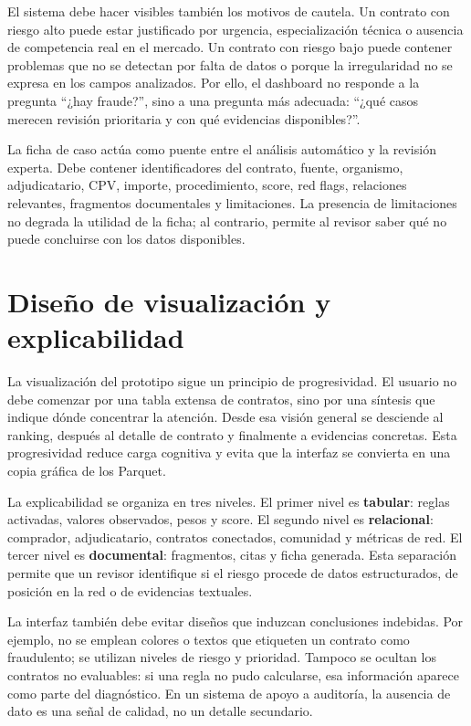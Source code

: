 \documentclass[11pt,a4paper,spanish]{book}
\numberwithin{equation}{chapter}
\numberwithin{figure}{chapter}
\begin{document}
El sistema debe hacer visibles tambi{\'e}n los motivos de cautela. Un contrato con riesgo alto puede
estar justificado por urgencia, especializaci{\'o}n t{\'e}cnica o ausencia de competencia real en el
mercado. Un contrato con riesgo bajo puede contener problemas que no se detectan por falta de datos
o porque la irregularidad no se expresa en los campos analizados. Por ello, el dashboard no responde
a la pregunta ``¿hay fraude?'', sino a una pregunta m{\'a}s adecuada: ``¿qu{\'e} casos merecen revisi{\'o}n
prioritaria y con qu{\'e} evidencias disponibles?''.

La ficha de caso act{\'u}a como puente entre el an{\'a}lisis autom{\'a}tico y la revisi{\'o}n experta. Debe
contener identificadores del contrato, fuente, organismo, adjudicatario, CPV, importe, procedimiento,
score, red flags, relaciones relevantes, fragmentos documentales y limitaciones. La presencia de
limitaciones no degrada la utilidad de la ficha; al contrario, permite al revisor saber qu{\'e} no
puede concluirse con los datos disponibles.

\section{Dise{\~n}o de visualizaci{\'o}n y explicabilidad}
\label{sec:visualizacion_explicabilidad_dashboard}

La visualizaci{\'o}n del prototipo sigue un principio de progresividad. El usuario no debe comenzar por una
tabla extensa de contratos, sino por una s{\'i}ntesis que indique d{\'o}nde concentrar la atenci{\'o}n.
Desde esa visi{\'o}n general se desciende al ranking, despu{\'e}s al detalle de contrato y finalmente a
evidencias concretas. Esta progresividad reduce carga cognitiva y evita que la interfaz se convierta
en una copia gr{\'a}fica de los Parquet.

La explicabilidad se organiza en tres niveles. El primer nivel es \textbf{tabular}: reglas activadas,
valores observados, pesos y score. El segundo nivel es \textbf{relacional}: comprador, adjudicatario,
contratos conectados, comunidad y m{\'e}tricas de red. El tercer nivel es \textbf{documental}: fragmentos,
citas y ficha generada. Esta separaci{\'o}n permite que un revisor identifique si el riesgo procede de
datos estructurados, de posici{\'o}n en la red o de evidencias textuales.

La interfaz tambi{\'e}n debe evitar dise{\~n}os que induzcan conclusiones indebidas. Por ejemplo, no se
emplean colores o textos que etiqueten un contrato como fraudulento; se utilizan niveles de riesgo y
prioridad. Tampoco se ocultan los contratos no evaluables: si una regla no pudo calcularse, esa
informaci{\'o}n aparece como parte del diagn{\'o}stico. En un sistema de apoyo a auditor{\'i}a, la
ausencia de dato es una se{\~n}al de calidad, no un detalle secundario.
\end{document}
